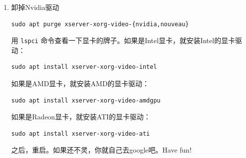 \documentclass{wx672ctexart} \usepackage{hyperref}
\begin{document}
\begin{enumerate}
\item 卸掉Nvidia驱动
\begin{verbatim}
sudo apt purge xserver-xorg-video-{nvidia,nouveau}
\end{verbatim}

用 \texttt{lspci} 命令查看一下显卡的牌子。如果是Intel显卡，就安装Intel的显卡驱动：
\begin{verbatim}
sudo apt install xserver-xorg-video-intel
\end{verbatim}

如果是AMD显卡，就安装AMD的显卡驱动：
\begin{verbatim}
sudo apt install xserver-xorg-video-amdgpu
\end{verbatim}

如果是Radeon显卡，就安装ATI的显卡驱动：
\begin{verbatim}
sudo apt install xserver-xorg-video-ati
\end{verbatim}

之后，重启。如果还不灵，你就自己去google吧。Have fun!
\end{enumerate}
\end{document}
